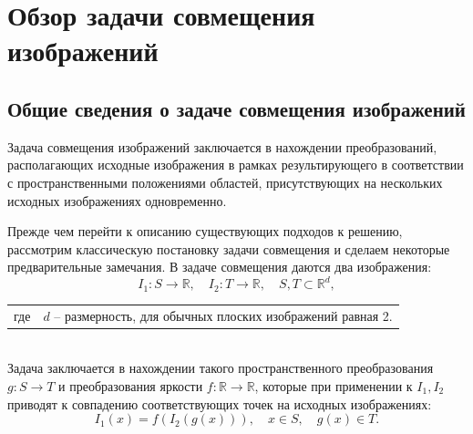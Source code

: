 \section{Обзор задачи совмещения изображений}
{
\subsection{Общие сведения о задаче совмещения изображений}{
   Задача совмещения изображений заключается в нахождении преобразований, располагающих исходные изображения в рамках результирующего в соответствии с пространственными положениями областей, присутствующих на нескольких исходных изображениях одновременно.	
   
   Прежде чем перейти к описанию существующих подходов к решению, рассмотрим классическую постановку задачи совмещения и сделаем некоторые предварительные замечания.
   В задаче совмещения даются два изображения:
   \begin{equation*}\label{problem_images}
   I_1 : S \rightarrow \mathbb{R}, \quad I_2 : T \rightarrow \mathbb{R},
   \quad S,T \subset \mathbb{R}^d,
   \end{equation*}
   	\begin{tabular}{ rl }
   	 \quad \quad где 
   	& $d$ -- размерность, для обычных плоских изображений равная 2.\\
   	\end{tabular}\\
   
   Задача заключается в нахождении такого пространственного преобразования $g:S \rightarrow T$ и преобразования яркости $f: \mathbb{R} \rightarrow \mathbb{R}$, которые при применении к $I_1, I_2$ приводят к совпадению соответствующих точек на исходных изображениях:
   \begin{equation}\label{problem_transform}
   I_1(x) = f(I_2(g(x))), \quad x \in S, \quad g(x) \in T.
   \end{equation} 
   
}}
